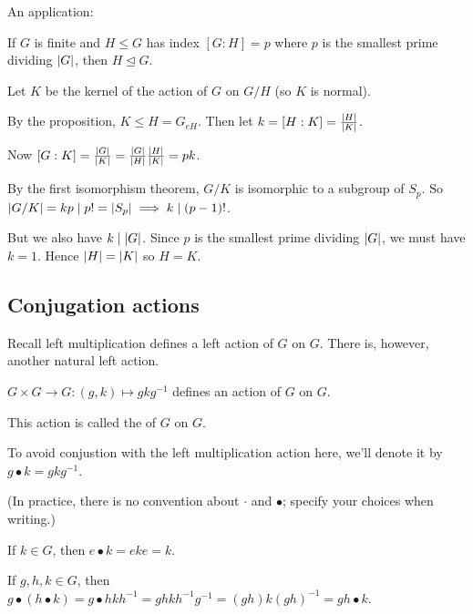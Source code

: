 \documentclass[12pt,letterpaper]{report}
\begin{document}
An application:

\begin{thm}{}{}
  If $G$ is finite and $H \leq G$ has index $[G : H] = p$ where $p$ is the smallest prime dividing
  $\lvert G\rvert$, then $H \trianglelefteq G$.
\end{thm}

\begin{thmproof}
  Let $K$ be the kernel of the action of $G$ on $G/H$ (so $K$ is normal).

  By the proposition, $K \leq H = G_{eH}$.
  Then let $k = [H : K] = \frac{\lvert H\rvert}{\lvert K\rvert}$.

  Now $[G : K] = \frac{\lvert G\rvert}{\lvert K\rvert} = \frac{\lvert G\rvert}{\lvert H\rvert} \frac{\lvert H\rvert}{\lvert K\rvert} = pk$.

  By the first isomorphism theorem, $G/K$ is isomorphic to a subgroup of $S_p$.
  So $\lvert G/K\rvert = kp \mid p! = \lvert S_p\rvert \implies k \mid (p - 1)!$.

  But we also have $k \mid \lvert G\rvert$.
  Since $p$ is the smallest prime dividing $\lvert G\rvert$, we must have $k = 1$.
  Hence $\lvert H\rvert = \lvert K\rvert$ so $H = K$.
\end{thmproof}

\pagebreak
\subsection{Conjugation actions}

Recall left multiplication defines a left action of $G$ on $G$.
There is, however, another natural left action.

\begin{lem}{}{}
  $G \times G \to G : (g, k) \mapsto gkg^{-1}$ defines an action of $G$ on $G$.
\end{lem}

This action is called the  of $G$ on $G$.

To avoid conjustion with the left multiplication action here, we'll denote it by
$g \bullet k = gkg^{-1}$.

(In practice, there is no convention about $\cdot$ and $\bullet$; specify your choices when
writing.)

\begin{thmproof}
  If $k \in G$, then $e \bullet k = eke = k$.

  If $g, h, k \in G$, then
  $g \bullet (h \bullet k) = g \bullet hkh^{-1} = ghkh^{-1}g^{-1} = (gh)k(gh)^{-1} = gh \bullet k$.
\end{thmproof}
\end{document}
